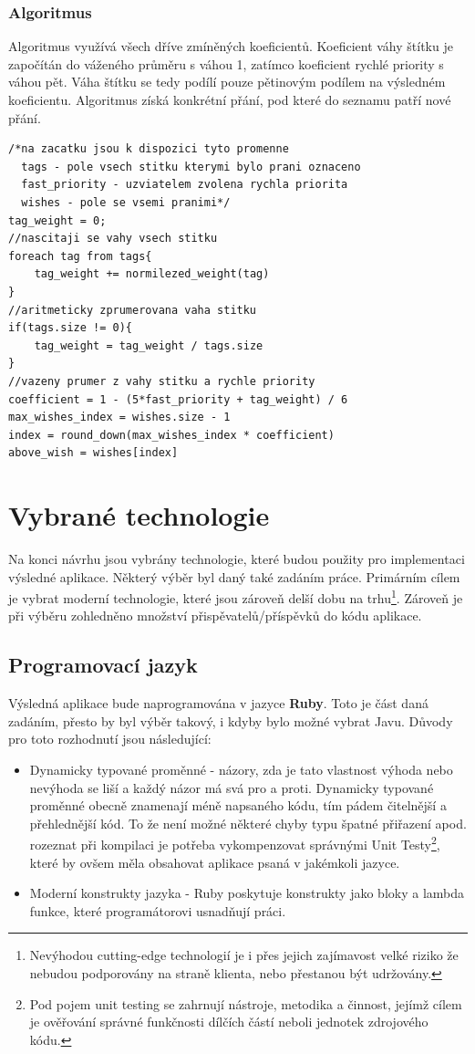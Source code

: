 \subsubsection{Algoritmus}
Algoritmus využívá všech dříve zmíněných koeficientů. Koeficient váhy štítku je započítán do váženého průměru s váhou 1, zatímco koeficient rychlé priority s váhou pět. Váha štítku se tedy podílí pouze pětinovým podílem na výsledném koeficientu. Algoritmus získá konkrétní přání, pod které do seznamu patří nové přání.
\lstset{language = c, style=custom}
\begin{lstlisting}
/*na zacatku jsou k dispozici tyto promenne
  tags - pole vsech stitku kterymi bylo prani oznaceno
  fast_priority - uzviatelem zvolena rychla priorita
  wishes - pole se vsemi pranimi*/
tag_weight = 0;
//nascitaji se vahy vsech stitku
foreach tag from tags{
	tag_weight += normilezed_weight(tag)
}
//aritmeticky zprumerovana vaha stitku
if(tags.size != 0){
	tag_weight = tag_weight / tags.size
}
//vazeny prumer z vahy stitku a rychle priority
coefficient = 1 - (5*fast_priority + tag_weight) / 6
max_wishes_index = wishes.size - 1
index = round_down(max_wishes_index * coefficient)
above_wish = wishes[index]
\end{lstlisting}

\section{Vybrané technologie}
Na konci návrhu jsou vybrány technologie, které budou použity pro implementaci výsledné aplikace. Některý výběr byl daný také zadáním práce. Primárním cílem je vybrat moderní technologie, které jsou zároveň delší dobu na trhu\footnote{Nevýhodou cutting-edge technologií je i přes jejich zajímavost velké riziko že nebudou podporovány na straně klienta, nebo přestanou být udržovány.}. Zároveň je při výběru zohledněno množství přispěvatelů/příspěvků do kódu aplikace.
\subsection{Programovací jazyk}
Výsledná aplikace bude naprogramována v jazyce \textbf{Ruby}. Toto je část daná zadáním, přesto by byl výběr takový, i kdyby bylo možné vybrat Javu. Důvody pro toto rozhodnutí jsou následující:
\begin{itemize}
\item Dynamicky typované proměnné - názory, zda je tato vlastnost výhoda nebo nevýhoda se liší a každý názor má svá pro a proti. Dynamicky typované proměnné obecně znamenají méně napsaného kódu, tím pádem čitelnější a přehlednější kód. To že není možné některé chyby typu špatné přiřazení apod. rozeznat při kompilaci je potřeba vykompenzovat správnými Unit Testy\footnote{Pod pojem unit testing se zahrnují nástroje, metodika a činnost, jejímž cílem je ověřování správné funkčnosti dílčích částí neboli jednotek zdrojového kódu.}, které by ovšem měla obsahovat aplikace psaná v jakémkoli jazyce\cite{website:oreilly:unit-testing}.
\item Moderní konstrukty jazyka - Ruby poskytuje konstrukty jako bloky a lambda funkce, které programátorovi usnadňují práci.

\end{itemize}

